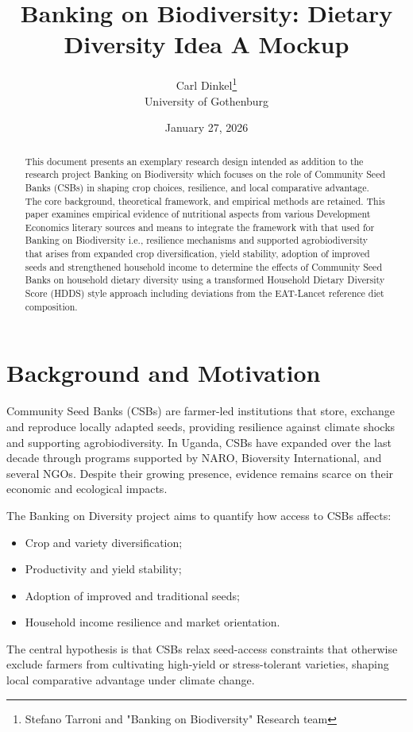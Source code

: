 \documentclass{article}
\title{Banking on Biodiversity: Dietary Diversity Idea A Mockup}
\author{Carl Dinkel\thanks{Stefano Tarroni and "Banking on Biodiversity" Research team}\\University of Gothenburg}
\date{January 27, 2026}
\begin{document}
\maketitle

\begin{abstract}
    This document presents an exemplary research design intended as addition to the research project Banking on Biodiversity which focuses on the role of Community Seed Banks (CSBs) in shaping crop choices, resilience, and local comparative advantage. The core background, theoretical framework, and empirical methods are retained. This paper examines empirical evidence of nutritional aspects from various Development Economics literary sources and means to integrate the framework with that used for Banking on Biodiversity i.e., resilience mechanisms and supported agrobiodiversity that arises from expanded crop diversification, yield stability, adoption of improved seeds and strengthened household income to determine the effects of Community Seed Banks on household dietary diversity using a transformed Household Dietary Diversity Score (HDDS) style approach including deviations from the EAT-Lancet reference diet composition.
\end{abstract}

\section{Background and Motivation}

Community Seed Banks (CSBs) are farmer-led institutions that store, exchange and reproduce
locally adapted seeds, providing resilience against climate shocks and supporting agrobiodiversity.
In Uganda, CSBs have expanded over the last decade through programs supported by NARO,
Bioversity International, and several NGOs. Despite their growing presence, evidence remains
scarce on their economic and ecological impacts.

The Banking on Diversity project aims to quantify how access to CSBs affects:\begin{itemize}
    \item Crop and variety diversification;
    \item Productivity and yield stability;
    \item Adoption of improved and traditional seeds;
    \item Household income resilience and market orientation.    
\end{itemize}

The central hypothesis is that CSBs relax seed-access constraints that otherwise exclude farmers
from cultivating high-yield or stress-tolerant varieties, shaping local comparative advantage under
climate change.
\end{document}
